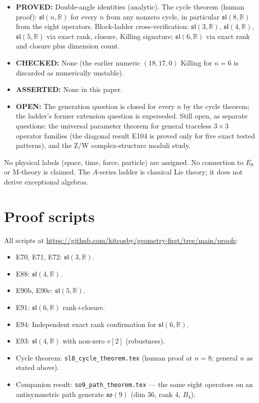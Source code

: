 \documentclass[11pt]{article}
\theoremstyle{definition}
\begin{document}
\begin{itemize}
\item \textbf{PROVED:} Double-angle identities (analytic). The cycle theorem (human proof): $\mathfrak{sl}(n,\mathbb{R})$ for every $n$ from any nonzero cycle, in particular $\mathfrak{sl}(8,\mathbb{R})$ from the eight operators. Block-ladder cross-verification: $\mathfrak{sl}(3,\mathbb{R})$, $\mathfrak{sl}(4,\mathbb{R})$, $\mathfrak{sl}(5,\mathbb{R})$ via exact rank, closure, Killing signature; $\mathfrak{sl}(6,\mathbb{R})$ via exact rank and closure plus dimension count.
\item \textbf{CHECKED:} None (the earlier numeric $(18,17,0)$ Killing for $n=6$ is discarded as numerically unstable).
\item \textbf{ASSERTED:} None in this paper.
\item \textbf{OPEN:} The generation question is closed for every $n$ by the cycle theorem; the ladder's former extension question is superseded. Still open, as separate questions: the universal parameter theorem for general traceless $3\times 3$ operator families (the diagonal result E104 is proved only for five exact tested patterns), and the Z/W complex-structure moduli study.
\end{itemize}

No physical labels (space, time, force, particle) are assigned. No connection to $E_8$ or M-theory is claimed. The $A$-series ladder is classical Lie theory; it does not derive exceptional algebras.

\section{Proof scripts}

All scripts at \url{https://github.com/kitcosby/geometry-first/tree/main/proofs}:
\begin{itemize}
\item E70, E71, E72: $\mathfrak{sl}(3,\mathbb{R})$.
\item E88: $\mathfrak{sl}(4,\mathbb{R})$.
\item E90b, E90c: $\mathfrak{sl}(5,\mathbb{R})$.
\item E91: $\mathfrak{sl}(6,\mathbb{R})$ rank+closure.
\item E94: Independent exact rank confirmation for $\mathfrak{sl}(6,\mathbb{R})$.
\item E93: $\mathfrak{sl}(4,\mathbb{R})$ with non-zero $v[2]$ (robustness).
\item Cycle theorem: \texttt{sl8\_cycle\_theorem.tex} (human proof at $n=8$; general $n$ as stated above).
\item Companion result: \texttt{so9\_path\_theorem.tex} --- the same eight operators on an antisymmetric path generate $\mathfrak{so}(9)$ (dim $36$, rank $4$, $B_4$).
\end{itemize}
\end{document}
